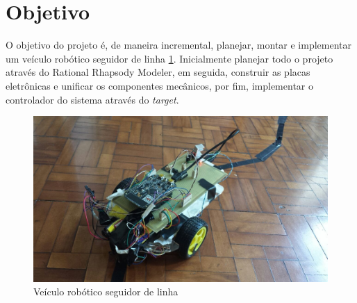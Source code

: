 \documentclass{article}
\begin{document}


\onehalfspacing
\section{Objetivo} 
O objetivo do projeto é, de maneira incremental, planejar, montar e implementar um veículo robótico seguidor de linha \ref{fig:robo}. Inicialmente planejar todo o projeto através do Rational Rhapsody Modeler, em seguida, construir as placas eletrônicas e unificar os componentes mecânicos, por fim, implementar o controlador do sistema através do \textit{target}. 

\begin{figure}[H]
	\centering
	\includegraphics[width=0.9\linewidth]{carrinho.JPG}
	\caption{Veículo robótico seguidor de linha}
	\label{fig:robo}
\end{figure}
	
\end{document}
